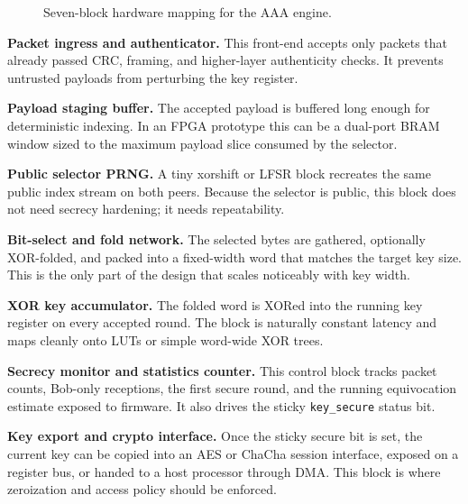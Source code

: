 \documentclass[11pt]{article}
\begin{document}
\begin{figure}[t]
\centering

\caption{Seven-block hardware mapping for the AAA engine.}
\label{fig:hardware}
\end{figure}

\textbf{Packet ingress and authenticator.} This front-end accepts only packets that already passed CRC, framing, and higher-layer authenticity checks. It prevents untrusted payloads from perturbing the key register.

\textbf{Payload staging buffer.} The accepted payload is buffered long enough for deterministic indexing. In an FPGA prototype this can be a dual-port BRAM window sized to the maximum payload slice consumed by the selector.

\textbf{Public selector PRNG.} A tiny xorshift or LFSR block recreates the same public index stream on both peers. Because the selector is public, this block does not need secrecy hardening; it needs repeatability.

\textbf{Bit-select and fold network.} The selected bytes are gathered, optionally XOR-folded, and packed into a fixed-width word that matches the target key size. This is the only part of the design that scales noticeably with key width.

\textbf{XOR key accumulator.} The folded word is XORed into the running key register on every accepted round. The block is naturally constant latency and maps cleanly onto LUTs or simple word-wide XOR trees.

\textbf{Secrecy monitor and statistics counter.} This control block tracks packet counts, Bob-only receptions, the first secure round, and the running equivocation estimate exposed to firmware. It also drives the sticky \texttt{key\_secure} status bit.

\textbf{Key export and crypto interface.} Once the sticky secure bit is set, the current key can be copied into an AES or ChaCha session interface, exposed on a register bus, or handed to a host processor through DMA. This block is where zeroization and access policy should be enforced.
\end{document}
